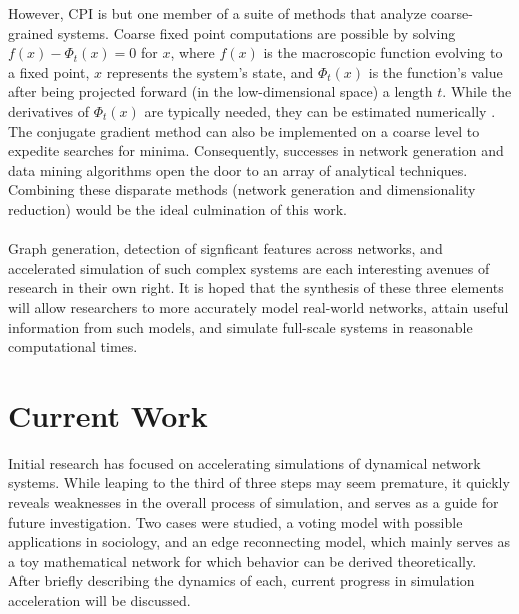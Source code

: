 \documentclass[11pt]{article}
\begin{document}
However, CPI is but one member of a suite of methods that analyze coarse-grained systems. Coarse fixed point computations are possible by solving $f(x) - \Phi_{t} (x) = 0$ for $x$, where $f(x)$ is the macroscopic function evolving to a fixed point, $x$ represents the system's state, and $\Phi_{t} (x)$ is the function's value after being projected forward (in the low-dimensional space) a length $t$. While the derivatives of $\Phi_{t} (x)$ are typically needed, they can be estimated numerically \cite{bold}.  The conjugate gradient method can also be implemented on a coarse level to expedite searches for minima. Consequently, successes in network generation and data mining algorithms open the door to an array of analytical techniques. Combining these disparate methods (network generation and dimensionality reduction) would be the ideal culmination of this work. \\ \\
Graph generation, detection of signficant features across networks, and accelerated simulation of such complex systems are each interesting avenues of research in their own right. It is hoped that the synthesis of these three elements will allow researchers to more accurately model real-world networks, attain useful information from such models, and simulate full-scale systems in reasonable computational times.
\section{Current Work}
Initial research has focused on accelerating simulations of dynamical network systems. While leaping to the third of three steps may seem premature, it quickly reveals weaknesses in the overall process of simulation, and serves as a guide for future investigation. Two cases were studied, a voting model with possible applications in sociology, and an edge reconnecting model, which mainly serves as a toy mathematical network for which behavior can be derived theoretically. After briefly describing the dynamics of each, current progress in simulation acceleration will be discussed.
\end{document}
